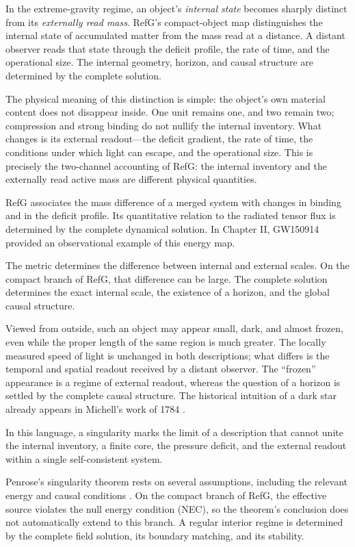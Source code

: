 \documentclass[11pt,a4paper]{article}
\begin{document}
In the extreme-gravity regime, an object's \emph{internal state} becomes sharply distinct from its \emph{externally read mass}. RefG's compact-object map distinguishes the internal state of accumulated matter from the mass read at a distance. A distant observer reads that state through the deficit profile, the rate of time, and the operational size. The internal geometry, horizon, and causal structure are determined by the complete solution.

The physical meaning of this distinction is simple: the object's own material content does not disappear inside. One unit remains one, and two remain two; compression and strong binding do not nullify the internal inventory. What changes is its external readout---the deficit gradient, the rate of time, the conditions under which light can escape, and the operational size. This is precisely the two-channel accounting of RefG: the internal inventory and the externally read active mass are different physical quantities.

RefG associates the mass difference of a merged system with changes in binding and in the deficit profile. Its quantitative relation to the radiated tensor flux is determined by the complete dynamical solution. In Chapter II, GW150914 provided an observational example of this energy map.

The metric determines the difference between internal and external scales. On the compact branch of RefG, that difference can be large. The complete solution determines the exact internal scale, the existence of a horizon, and the global causal structure.

Viewed from outside, such an object may appear small, dark, and almost frozen, even while the proper length of the same region is much greater. The locally measured speed of light is unchanged in both descriptions; what differs is the temporal and spatial readout received by a distant observer. The ``frozen'' appearance is a regime of external readout, whereas the question of a horizon is settled by the complete causal structure. The historical intuition of a dark star already appears in Michell's work of 1784 \citep{michell1784}.

In this language, a singularity marks the limit of a description that cannot unite the internal inventory, a finite core, the pressure deficit, and the external readout within a single self-consistent system.

Penrose's singularity theorem rests on several assumptions, including the relevant energy and causal conditions \citep{penrose1965}. On the compact branch of RefG, the effective source violates the null energy condition (NEC), so the theorem's conclusion does not automatically extend to this branch. A regular interior regime is determined by the complete field solution, its boundary matching, and its stability.
\end{document}
